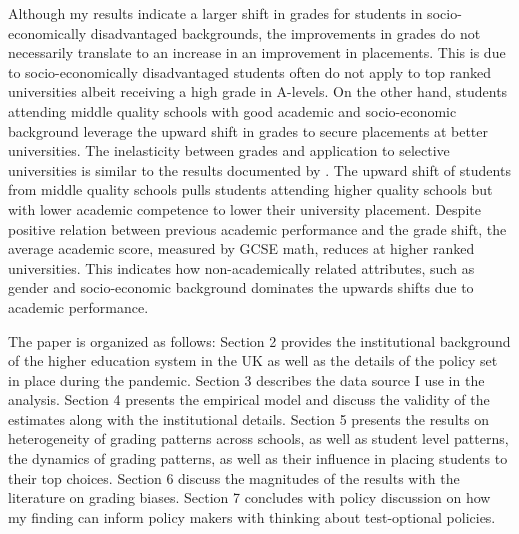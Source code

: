 Although my results indicate a larger shift in grades for students in socio-economically disadvantaged backgrounds, the improvements in grades do not necessarily translate to an increase in an improvement in placements. This is due to socio-economically disadvantaged students often do not apply to top ranked universities albeit receiving a high grade in A-levels. On the other hand, students attending middle quality schools with good academic and socio-economic background leverage the upward shift in grades to secure placements at better universities. The inelasticity between grades and application to selective universities is similar to the results documented by \cite{NBERw18586}.  The upward shift of students from middle quality schools pulls students attending higher quality schools but with lower academic competence to lower their university placement. Despite positive relation between previous academic performance and the grade shift, the average academic score, measured by GCSE math, reduces at higher ranked universities. This indicates how non-academically related attributes, such as gender and socio-economic background dominates the upwards shifts due to academic performance. 

The paper is organized as follows: Section 2 provides the institutional background of the higher education system in the UK as well as the details of the policy set in place during the pandemic. Section 3 describes the data source I use in the analysis. Section 4 presents the empirical model and discuss the validity of the estimates along with the institutional details. Section 5 presents the results on heterogeneity of grading patterns across schools, as well as student level patterns, the dynamics of grading patterns, as well as their influence in placing students to their top choices. Section 6 discuss the magnitudes of the results with the literature on grading biases. Section 7 concludes with policy discussion on how my finding can inform policy makers with thinking about test-optional policies. 